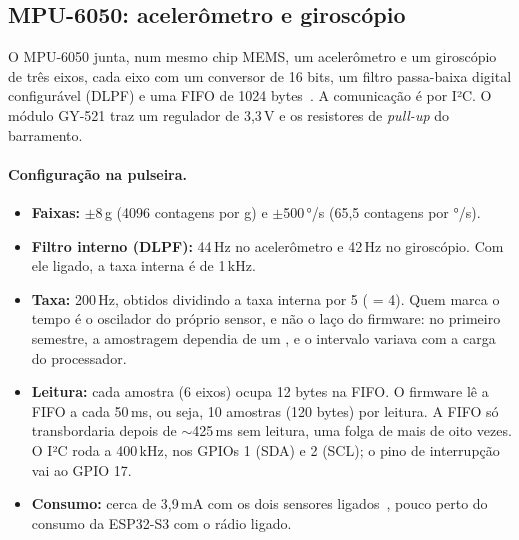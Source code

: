 \subsection{MPU-6050: acelerômetro e giroscópio}\label{sec:mpu}

O MPU-6050 junta, num mesmo chip MEMS, um acelerômetro e um giroscópio de três eixos, cada
eixo com um conversor de 16 bits, um filtro passa-baixa digital configurável (DLPF) e uma FIFO
de 1024 bytes~\cite{mpu6050}. A comunicação é por I²C. O módulo GY-521 traz um regulador de
3,3\,V e os resistores de \textit{pull-up} do barramento.

\paragraph{Configuração na pulseira.}
\begin{itemize}
  \item \textbf{Faixas:} $\pm$8\,g (4096 contagens por g) e $\pm$500\,°/s (65,5 contagens por °/s).
  \item \textbf{Filtro interno (DLPF):} 44\,Hz no acelerômetro e 42\,Hz no giroscópio. Com ele
        ligado, a taxa interna é de 1\,kHz.
  \item \textbf{Taxa:} 200\,Hz, obtidos dividindo a taxa interna por 5 ( = 4).
        Quem marca o tempo é o oscilador do próprio sensor, e não o laço do firmware: no
        primeiro semestre, a amostragem dependia de um , e o intervalo
        variava com a carga do processador.
  \item \textbf{Leitura:} cada amostra (6 eixos) ocupa 12 bytes na FIFO. O firmware lê a FIFO a
        cada 50\,ms, ou seja, 10 amostras (120 bytes) por leitura. A FIFO só transbordaria
        depois de $\sim$425\,ms sem leitura, uma folga de mais de oito vezes. O I²C roda a
        400\,kHz, nos GPIOs 1 (SDA) e 2 (SCL); o pino de interrupção vai ao GPIO 17.
  \item \textbf{Consumo:} cerca de 3,9\,mA com os dois sensores ligados~\cite{mpu6050},
        pouco perto do consumo da ESP32-S3 com o rádio ligado.
\end{itemize}

